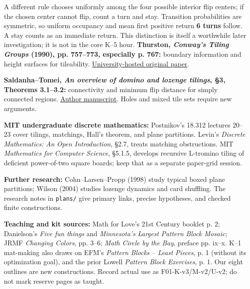 \documentclass[11pt]{article}
\begin{document}
A different rule chooses uniformly among the four possible interior flip centers; if the chosen center cannot flip, count a turn and stay. Transition probabilities are symmetric, so uniform occupancy and mean first positive return \textbf{6 turns} follow. A stay counts as an immediate return. This distinction is itself a worthwhile later investigation; it is not in the core K--5 hour.
\textbf{Thurston, \emph{Conway's Tiling Groups} (1990), pp. 757--773, especially p. 767:} boundary information and height surfaces for tileability. \href{https://www.ibr.cs.tu-bs.de/users/fekete/oldhp/Sem06/thurston.pdf}{University-hosted original paper}.\par
\textbf{Saldanha--Tomei, \emph{An overview of domino and lozenge tilings}, \S3, Theorems 3.1--3.2:} connectivity and minimum flip distance for simply connected regions. \href{https://arxiv.org/pdf/math/9801111}{Author manuscript}. Holes and mixed tile sets require new arguments.\par
\textbf{MIT undergraduate discrete mathematics:} Postnikov's 18.312 lectures 20--23 cover tilings, matchings, Hall's theorem, and plane partitions. Levin's \emph{Discrete Mathematics: An Open Introduction}, \S2.7, treats matching obstructions. MIT \emph{Mathematics for Computer Science}, \S5.1.5, develops recursive L-tromino tiling of deficient power-of-two square boards; keep that as a separate paper-grid session.\par
\textbf{Further research:} Cohn--Larsen--Propp (1998) study typical boxed plane partitions; Wilson (2004) studies lozenge dynamics and card shuffling. The research notes in \texttt{plans/} give primary links, precise hypotheses, and checked finite constructions.

\textbf{Teaching and kit sources:} Math for Love's 21st Century booklet p. 2; Danielson's \emph{Five fun things} and \emph{Minnesota's Largest Pattern Block Mosaic}; JRMF \emph{Changing Colors}, pp. 3--6; \emph{Math Circle by the Bay}, preface pp. ix--x. K--1 mat-making also draws on EFM's \emph{Pattern Blocks -- Least Pieces}, p. 1 (without its optimization goal), and the prior Lowell \emph{Pattern Block Exercises}, p. 1. Our eight outlines are new constructions. Record actual use as F01-K-v3/M-v2/U-v2; do not mark reserve pages as taught.
\end{document}
